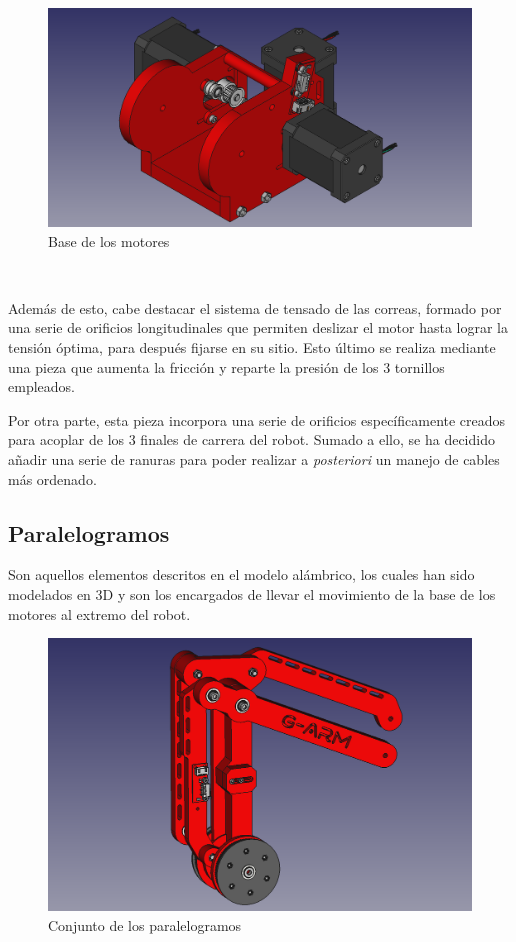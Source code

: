 \begin{figure} [ht!]
  \begin{center}
    \includegraphics[width=12cm]{figs/base_motores.png}
  \end{center}
  \caption{Base de los motores}
  \label{fig:base_motores}
\end{figure}\ 

Además de esto, cabe destacar el sistema de tensado de las correas, formado por una serie de orificios longitudinales que permiten deslizar el motor 
hasta lograr la tensión óptima, para después fijarse en su sitio. Esto último se realiza mediante una pieza que aumenta la fricción y reparte la presión 
de los 3 tornillos empleados.

Por otra parte, esta pieza incorpora una serie de orificios específicamente creados para acoplar de los 3 finales de carrera del robot. Sumado a ello, 
se ha decidido añadir una serie de ranuras para poder realizar a \textit{posteriori} un manejo de cables más ordenado.

\newpage
\subsection{Paralelogramos}
\noindent Son aquellos elementos descritos en el modelo alámbrico, los cuales han sido modelados en 3D y son los encargados de llevar el 
movimiento de la base de los motores al extremo del robot. 

\begin{figure} [ht!]
  \begin{center}
    \includegraphics[width=13cm]{figs/links_assembly.png}
  \end{center}
  \caption{Conjunto de los paralelogramos}
  \label{fig:links}
\end{figure}\ 

